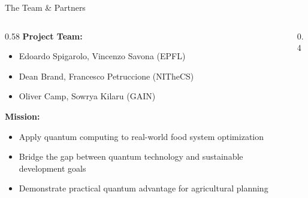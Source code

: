 \documentclass[aspectratio=169,10pt]{beamer}
\begin{document}
\begin{frame}{The Team \& Partners}
    
    \vspace{-0.1cm}
    \begin{columns}[T]
        
        \begin{column}{0.58\textwidth}
            \small\textbf{Project Team:}
            \begin{itemize}
                \item Edoardo Spigarolo, Vincenzo Savona (EPFL)
                \item Dean Brand, Francesco Petruccione (NITheCS)
                \item Oliver Camp, Sowrya Kilaru (GAIN)
            \end{itemize}
            
            
            \small\textbf{Mission:}
            \begin{itemize}\scriptsize
                \item Apply quantum computing to real-world food system optimization
                \item Bridge the gap between quantum technology and sustainable development goals
                \item Demonstrate practical quantum advantage for agricultural planning
            \end{itemize}
            
            
        \end{column}

    \begin{column}{0.4\textwidth}
    \vspace{-1cm}
\end{column}
\end{columns}
\end{frame}
\end{document}
